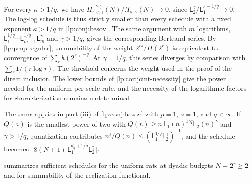 \documentclass[11pt,a4paper]{article}
\begin{document}
\begin{observacao}
\label{lp:obs:loglog}
For every $\kappa>1/q$, we have $H^{(2)}_{s;q,\gamma}(N)/H_{s,\kappa}(N)\to0$, since $\mathsf L_2^{\gamma}/\mathsf L_1^{\kappa-1/q}\to0$. The log-log schedule is thus strictly smaller than every schedule with a fixed exponent $\kappa>1/q$ in \cref{lp:conj:besov}. The same argument with $m$ logarithms, $\mathsf L_1^{1/q}\cdots\mathsf L_{m-1}^{1/q}\mathsf L_m^{\gamma}$ and $\gamma>1/q$, gives the corresponding Bertrand series. By \cref{lp:prop:regular}, summability of the weight $2^{rs}/H(2^r)$ is equivalent to convergence of $\sum_rh(2^r)^{-q}$. At $\gamma=1/q$, this series diverges by comparison with $\sum_r1/(r\log r)$. The threshold concerns the weight used in the proof of the direct inclusion. The lower bounds of \cref{lp:cor:joint-necessity} give the power needed for the uniform per-scale rate, and the necessity of the logarithmic factors for characterization remains undetermined.

The same applies in part (iii) of \cref{lp:conj:besov} with $p=1$, $s=1$, and $q<\infty$. If $Q(n)$ is the smallest power of two with $Q(n)\ge n\,\mathsf L_1(n)^{1/q}\mathsf L_2(n)^{\gamma}$ and $\gamma>1/q$, quantization contributes $n^{s}/Q(n)\le(\mathsf L_1^{1/q}\mathsf L_2^{\gamma})^{-1}$, and the schedule becomes $\lceil8(N+1)\,\mathsf L_1^{\theta_q+1/q}\mathsf L_2^{\gamma}\rceil$.
\end{observacao}

 summarizes sufficient schedules for the uniform rate at dyadic budgets $N=2^r\ge2$ and for summability of the realization functional.
\end{document}
